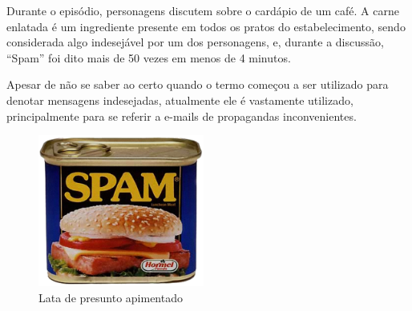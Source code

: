 \documentclass[a4paper,dvipdfm]{article}
\begin{document}
		Durante o episódio, personagens discutem sobre o cardápio de um café. 
		A carne enlatada é um ingrediente presente em todos os pratos do estabelecimento, sendo considerada algo indesejável por um dos personagens, e, durante a discussão, ``Spam'' foi dito mais de 50 vezes em menos de 4 minutos.

		Apesar de não se saber ao certo quando o termo começou a ser utilizado para denotar mensagens indesejadas, atualmente ele é vastamente utilizado, principalmente para  se referir a e-mails de propagandas inconvenientes.
		
		\begin{figure}[ht]
			\centering
			\includegraphics [height=5cm]{Imagens/spam/spam.png}
			\caption{Lata de presunto apimentado}
			\label{fig:spam}
		\end{figure}
\end{document}
